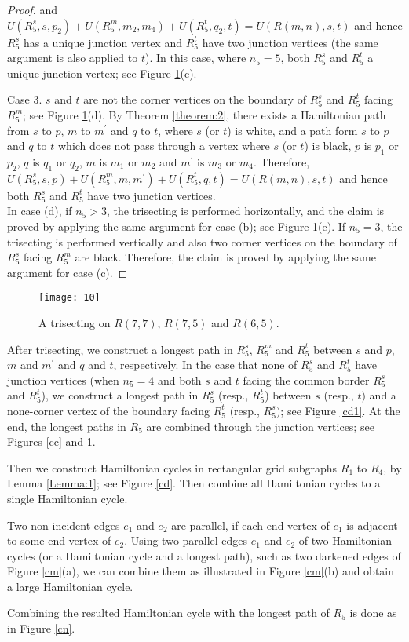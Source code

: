 \documentclass[preprint,12pt]{elsarticle}
\begin{document}
\begin{proof}
and
$U(R_{5}^{s},s,p_{2})+U(R_{5}^{m},m_{2},m_{4})+U(R_{5}^{t},q_{2},t)=U(R(m,n),s,t)$
and hence $R^{s}_5$ has a unique junction vertex and $R^{t}_5$ have
two junction vertices (the same argument is also applied to $t$). In
this case, where $n_5=5$, both $R^{s}_{5}$ and $R^{t}_{5}$ a unique
junction vertex; see Figure \ref{ccv}(c).
\par Case 3. $s$ and $t$ are not the corner vertices on the
boundary of $R^{s}_{5}$ and $R^{t}_{5}$ facing $R^{m}_{5}$; see
Figure \ref{ccv}(d). By Theorem \ref{theorem:2}, there exists a
Hamiltonian path from $s$ to $p$, $m$ to $m^{'}$ and $q$ to $t$,
where $s$ (or $t$) is white, and a path form $s$ to $p$ and $q$ to
$t$ which does not pass through a vertex where $s$ (or $t$) is
black, $p$ is $p_1$ or $p_2$, $q$ is $q_1$ or $q_2$, $m$ is $m_1$ or $m_2$ and $m^{'}$ is $m_3$ or $m_4$. Therefore,
$U(R_{5}^{s},s,p)+U(R_{5}^{m},m,m^{'})+U(R_{5}^{t},q,t)=U(R(m,n),s,t)$
and hence both $R^{s}_{5}$ and $R^{t}_{5}$ have two junction
vertices.\\
In case (d), if $n_{5} > 3$, the trisecting is performed
horizontally, and the claim is proved by applying the same argument
for case (b); see Figure \ref{ccv}(e). If $n_{5}=3$, the trisecting
is performed vertically
and also
two corner vertices on the boundary of $R^{s}_{5}$ facing
$R^{m}_{5}$ are black. Therefore, the claim is proved by applying
the same argument for case (c).
\end{proof}

\begin{figure}[htb]
  \centering
  \texttt{[image: 10]}
  \caption[]{\small A trisecting on $R(7,7)$, $R(7,5)$ and $R(6,5)$.}
  \label{ccv}
\end{figure}
After trisecting, we construct a longest path in $R^{s}_5$,
$R^{m}_5$ and $R^{t}_5$ between $s$ and $p$, $m$ and $m^{'}$ and $q$
and $t$, respectively. In the case that none of $R^{s}_{5}$ and
$R^{t}_{5}$ have junction vertices (when $n_{5}=4$ and both $s$ and
$t$ facing the common border $R^{s}_{5}$ and $R^{t}_{5}$), we
construct a longest path in $R^{s}_{5}$ (resp., $R^{t}_5$) between
$s$ (resp., $t)$ and a none-corner vertex of the boundary facing
$R^{t}_{5}$ (resp., $R^{s}_5)$; see Figure \ref{cd1}. At the end,
the longest paths in $R_5$ are combined through the junction
vertices; see Figures \ref{cc} and \ref{ccv}.\par Then we construct
Hamiltonian cycles in rectangular grid subgraphs $R_1$ to $R_4$, by
Lemma \ref{Lemma:1}; see Figure \ref{cd}. Then combine all
Hamiltonian cycles to a single Hamiltonian cycle. \par Two
non-incident edges $e_1$ and $e_2$ are parallel, if each end vertex
of $e_1$ is adjacent to some end vertex of $e_2$. Using two parallel
edges $e_1$ and $e_2$ of two Hamiltonian cycles (or a Hamiltonian
cycle and a longest path), such as two darkened edges of Figure
\ref{cm}(a), we can combine them as illustrated in Figure
\ref{cm}(b) and obtain a large Hamiltonian cycle.\par Combining the
resulted Hamiltonian cycle with
the longest path of $R_5$ is done as in Figure \ref{cn}. \\
\end{document}
